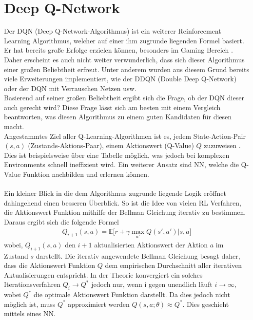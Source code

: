 \section{Deep Q-Network} \label{sec:Grundlagen_Deep_Q_Learning}
Der DQN (Deep Q-Network-Algorithmus) ist ein weiterer Reinforcement Learning Algorithmus, welcher auf einer ihm zugrunde liegenden Formel basiert. Er hat bereits große Erfolge erzielen können, besonders im Gaming Bereich \citep{DBLP:journals/corr/MnihKSGAWR13}. Daher erscheint es auch nicht weiter verwunderlich, dass sich dieser Algorithmus einer großen Beliebtheit erfreut. Unter anderem wurden aus diesem Grund bereits viele Erweiterungen implementiert, wie der DDQN (Double Deep Q-Network) oder der DQN mit Verrauschen Netzen usw.\\
Basierend auf seiner großen Beliebtheit ergibt sich die Frage, ob der DQN dieser auch gerecht wird? Diese Frage lässt sich am besten mit einem Vergleich beantworten, was diesen Algorithmus zu einem guten Kandidaten für diesen macht.\\ 
Angestammtes Ziel aller Q-Learning-Algorithmen ist es, jedem State-Action-Pair $(s,a)$ (Zustands-Aktions-Paar), einem Aktionswert (Q-Value) $Q$ zuzuweisen \citep[S. 126]{DRL_Lapan}. 
Dies ist beispielsweise über eine Tabelle möglich, was jedoch bei komplexen Environments schnell ineffizient wird. Ein weiterer Ansatz sind NN, welche die Q-Value Funktion nachbilden und erlernen können.\\
\\Ein kleiner Blick in die dem Algorithmus zugrunde liegende Logik eröffnet dahingehend einen besseren Überblick. 
So ist die Idee von vielen RL Verfahren, die Aktionswert Funktion mithilfe der Bellman Gleichung iterativ zu bestimmen. Daraus ergibt sich die folgende Formel \citep{DBLP:journals/corr/MnihKSGAWR13}
\begin{align}
	Q_{i+1}(s,a) = \mathbb{E} \bigl\lbrack r + \gamma \max_{a'} Q(s',a')|s,a \bigr\rbrack
	\label{eq:Grundlagen_Bellman_Gleichung_iterativ}
\end{align}
wobei, $Q_{i+1}(s,a)$ den $i+1$ aktualisierten Aktionswert der Aktion $a$ im Zustand $s$ darstellt.
Die iterativ angewendete Bellman Gleichung  besagt daher, dass die Aktionswert Funktion $Q$ dem empirischen Durchschnitt aller iterativen Aktualisierungen entspricht.
In der Theorie konvergiert ein solches Iterationsverfahren $Q_i \longrightarrow Q^*$ jedoch nur, wenn i gegen unendlich läuft $i \longrightarrow \infty$, wobei $Q^*$ die optimale Aktionswert Funktion darstellt. Da dies jedoch nicht möglich ist, muss $Q^*$ approximiert werden $Q(s,a;\theta) \approx Q^*$. Dies geschieht mittels eines NN.
